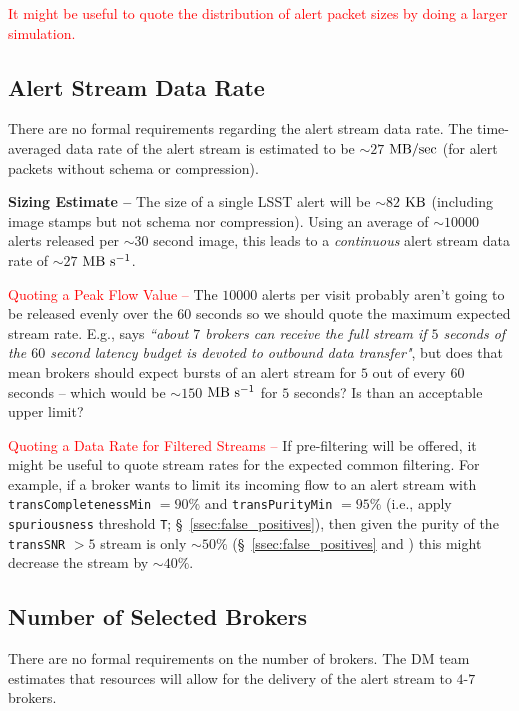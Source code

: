 \documentclass[DM,authoryear,toc]{lsstdoc}
\begin{document}
\textcolor{red}{It might be useful to quote the distribution of alert packet sizes by doing a larger simulation.}


\subsection{Alert Stream Data Rate}\label{ssec:data_rate}

There are no formal requirements regarding the alert stream data rate. The time-averaged data rate of the alert stream is estimated to be $\sim27$ $\rm MB/sec$ (for alert packets without schema or compression).

{\bf Sizing Estimate --} The size of a single LSST alert will be $\sim82$ $\rm KB$ (including image stamps but not schema nor compression). Using an average of $\sim10000$ alerts released per $\sim30$ second image, this leads to a {\it continuous} alert stream data rate of  $\sim27$ $\rm MB\ s^{-1}$. 

\textcolor{red}{Quoting a Peak Flow Value --} The $10000$ alerts per visit probably aren't going to be released evenly over the 60 seconds so we should quote the maximum expected stream rate. E.g.,  says {\it ``about $7$ brokers can receive the full stream if $5$ seconds of the $60$ second latency budget is devoted to outbound data transfer"}, but does that mean brokers should expect bursts of an alert stream for $5$ out of every $60$ seconds -- which would be $\sim150$ $\rm MB\ s^{-1}$ for $5$ seconds? Is than an acceptable upper limit?

\textcolor{red}{Quoting a Data Rate for Filtered Streams --} If pre-filtering will be offered, it might be useful to quote stream rates for the expected common filtering. For example, if a broker wants to limit its incoming flow to an alert stream with {\tt transCompletenessMin} $=90\%$ and {\tt transPurityMin} $=95\%$ (i.e., apply {\tt spuriousness} threshold {\tt T}; \S~\ref{ssec:false_positives}), then given the purity of the {\tt transSNR} $>5$ stream is only $\sim50\%$ (\S~\ref{ssec:false_positives} and ) this might decrease the stream by $\sim40\%$. 



\subsection{Number of Selected Brokers}\label{ssec:num_brokers}

There are no formal requirements on the number of brokers. The DM team estimates that resources will allow for the delivery of the alert stream to $4$-$7$ brokers.
\end{document}
